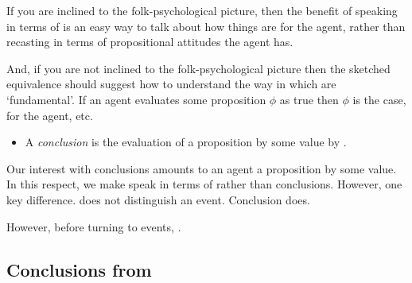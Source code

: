 \begin{note}
  If you are inclined to the folk-psychological picture, then the benefit of speaking in terms of  is an easy way to talk about how things are for the agent, rather than recasting in terms of propositional attitudes the agent has.

  And, if you are not inclined to the folk-psychological picture then the sketched equivalence should suggest how to understand the way in which  are `fundamental'.
  If an agent evaluates some proposition \(\phi\) as true then \(\phi\) is the case, for the agent, etc.
\end{note}

\begin{note}
  \begin{definition}
    \label{assu:concluding:pvp}
    \begin{itemize}
    \item
      A \emph{conclusion} is the evaluation of a proposition by some value by \vAgent{}.
    \end{itemize}
    \vspace{-\baselineskip}
  \end{definition}

  Our interest with conclusions amounts to an agent \evaling{} a proposition by some value.
  In this respect, we make speak in terms of  rather than conclusions.
  However, one key difference.
   does not distinguish an event.
  Conclusion does.

  However, before turning to events, .
\end{note}

\subsection{Conclusions from }
\label{sec:pools-premises}

